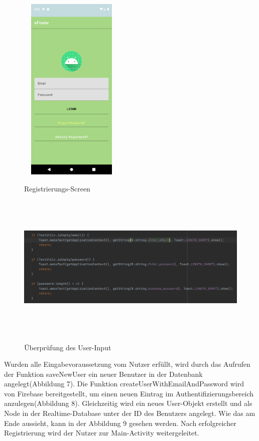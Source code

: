 \documentclass[12pt, a4paper, oneside]{article}
\begin{document}
\begin{figure}
\includegraphics[width=5cm, height=9cm]{Registrierungs-Screen.png}
\centering
\label{register}
\caption{Registrierungs-Screen}
\end{figure}
\begin{figure}
\includegraphics[width=1\textwidth, height=7cm]{SignUp_check.png}
\centering
\label{input_check}
\caption{Überprüfung des User-Input}
\end{figure}
Wurden alle Eingabevoraussetzung vom Nutzer erfüllt, wird durch das Aufrufen der Funktion saveNewUser ein neuer Benutzer in der Datenbank angelegt(Abbildung 7). Die Funktion createUserWithEmailAndPassword wird von Firebase bereitgestellt, um einen neuen Eintrag im Authentifizierungsbereich anzulegen(Abbildung 8). Gleichzeitig wird ein neues User-Objekt erstellt und als Node in der Realtime-Database unter der ID des Benutzers angelegt. Wie das am Ende aussieht, kann in der Abbildung 9 gesehen werden. Nach erfolgreicher Registrierung wird der Nutzer zur Main-Activity weitergeleitet.\\
\end{document}
